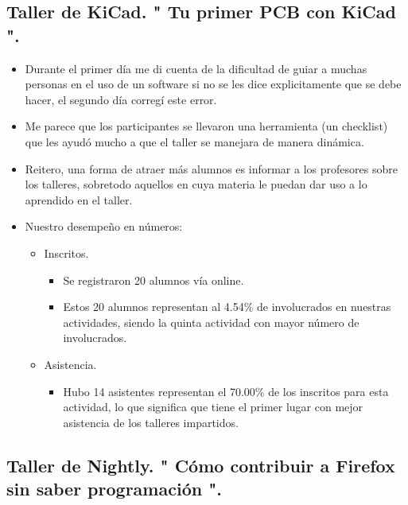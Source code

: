 \documentclass[a4paper,11pt]{article}                 %
\begin{document}
  \subsection{Taller de KiCad. " Tu primer PCB con KiCad ".}  
  
  
    \begin{itemize}
    \item Durante el primer día me di cuenta de la dificultad de guiar a muchas personas en el uso de un software si no se les dice explicitamente que se debe hacer, el segundo día corregí este error.
    \item Me parece que los participantes se llevaron una herramienta (un checklist) que les ayudó mucho a que el taller se manejara de manera dinámica.
    \item Reitero, una forma de atraer más alumnos es informar a los profesores sobre los talleres, sobretodo aquellos en cuya materia le puedan dar uso a lo aprendido en el taller.
    
    \item Nuestro desempeño en números:
    
    \begin{itemize}
 
    
    \item Inscritos.
    \begin{itemize}
      \item Se registraron 20 alumnos vía online.
      \item Estos 20 alumnos representan al 4.54\% de involucrados en nuestras actividades, siendo la quinta actividad con mayor número de involucrados. 
    \end{itemize}
    
    \item Asistencia.
    \begin{itemize}
      \item Hubo 14 asistentes representan el 70.00\% de los inscritos para esta actividad, lo que significa que tiene el primer lugar con mejor asistencia de los talleres impartidos. 
    \end{itemize}
    \end{itemize} 
    
  \end{itemize}     
  \subsection{Taller de Nightly. " {Cómo} contribuir a Firefox sin saber programación ".}  
  
\end{document}
